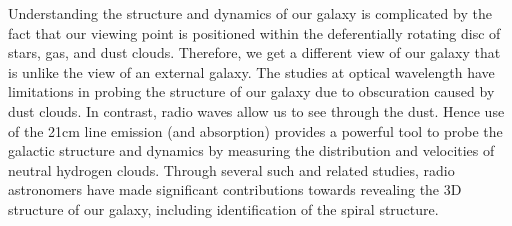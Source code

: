 \large{
    Understanding the structure and dynamics of our galaxy is complicated by the fact that our viewing point is positioned within the deferentially rotating disc of stars, gas, and dust clouds. Therefore, we get a different view of our galaxy that is unlike the view of an external galaxy. The studies at optical wavelength have limitations in probing the structure of our galaxy due to obscuration caused by dust clouds. 
In contrast, radio waves allow us to see through the dust. Hence use of the 21cm line emission (and absorption) provides a powerful tool to probe the galactic structure and dynamics  by measuring the distribution and velocities of neutral hydrogen clouds. Through several such and related studies, radio astronomers have made significant contributions towards revealing the 3D structure of our galaxy, including identification of the spiral structure.





}
